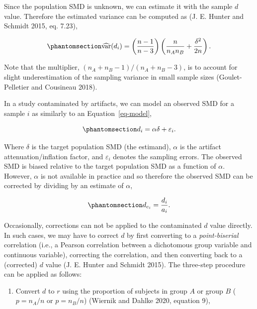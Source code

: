 \documentclass[
  letterpaper,
  DIV=11,
  numbers=noendperiod]{scrreprt}
\providecommand{\tightlist}{%
  \setlength{\itemsep}{0pt}\setlength{\parskip}{0pt}}\usepackage{longtable,booktabs,array}
\begin{document}
Since the population SMD is unknown, we can estimate it with the sample
\(d\) value. Therefore the estimated variance can be computed as (J. E.
Hunter and Schmidt 2015, eq. 7.23),

\begin{equation}\phantomsection\label{eq-var-d-est}{
\widehat{\text{var}}(d_i) = \left(\frac{n - 1}{n - 3}\right)\left(\frac{n}{n_An_B} + \frac{\delta^2}{2n}\right).
}\end{equation}

Note that the multiplier, \((n_A+n_B - 1)/(n_A+n_B - 3)\), is to account
for slight underestimation of the sampling variance in small sample
sizes (Goulet-Pelletier and Cousineau 2018).

In a study contaminated by artifacts, we can model an observed SMD for a
sample \(i\) as similarly to an Equation~\ref{eq-model},

\begin{equation}\phantomsection\label{eq-model-d}{
d_i =\alpha \delta + 
\varepsilon_i.
}\end{equation}

Where \(\delta\) is the {target population SMD (the estimand)},
\(\alpha\) is the {artifact attenuation/inflation factor}, and
\(\varepsilon_i\) denotes the {sampling errors}. The observed SMD is
biased relative to the target population SMD as a function of
\(\alpha\). However, \(\alpha\) is not available in practice and so
therefore the observed SMD can be corrected by dividing by an estimate
of \(\alpha\),

\begin{equation}\phantomsection\label{eq-corr-d}{
d_{c_i} = \frac{d_i}{a_i}.
}\end{equation}

Occasionally, corrections can not be applied to the contaminated \(d\)
value directly. In such cases, we may have to correct \(d\) by first
converting to a \emph{point-biserial} correlation (i.e., a Pearson
correlation between a dichotomous group variable and continuous
variable), correcting the correlation, and then converting back to a
(corrected) \(d\) value (J. E. Hunter and Schmidt 2015). The three-step
procedure can be applied as follows:

\begin{enumerate}
\def\labelenumi{\arabic{enumi}.}
\tightlist
\item
  Convert \(d\) to \(r\) using the proportion of subjects in group \(A\)
  or group \(B\) (\(p=n_A/n\) or \(p=n_B/n\)) (Wiernik and Dahlke 2020,
  equation 9),
\end{enumerate}
\end{document}
